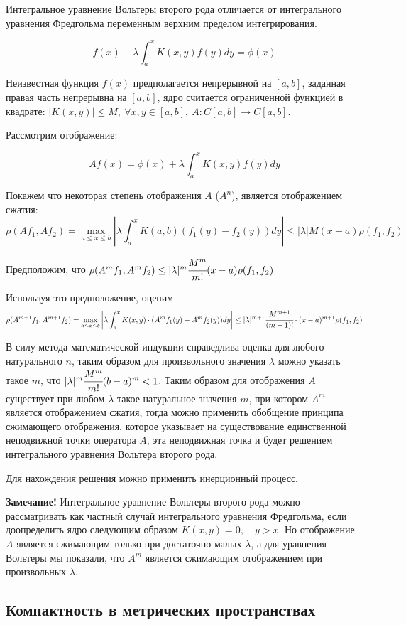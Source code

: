 \documentclass[14pt]{extarticle}
\theoremstyle{definition}
\theoremstyle{remark}
\renewcommand{\[}{\begin{dmath*}[compact]}
\renewcommand{\]}{\end{dmath*}}
\newcommand{\sep}{ , \ \allowbreak }
\begin{document}
Интегральное уравнение Вольтеры второго рода отличается от интегрального уравнения Фредгольма переменным верхним пределом интегрирования.

\[ f(x)-\lambda \int_a^xK(x,y)f(y)dy=\phi(x)\]

Неизвестная функция $f(x)$ предполагается непрерывной на $[a,b]$, заданная правая часть непрерывна на $[a,b]$, ядро считается ограниченной функцией в квадрате: $|K(x,y)|\leq M\sep\forall x,y\in[a,b]\sep A:C[a,b]\to C[a,b]$.

Рассмотрим отображение:

\[ Af(x)=\phi(x)+\lambda\int_a^xK(x,y)f(y)dy \]

Покажем что некоторая степень отображения $A$ ($A^n$), является отображением сжатия:
\[\rho(Af_1,Af_2)=\max_{a\leq x\leq b}\left|\lambda\int_a^xK(a,b)(f_1(y)-f_2(y))dy\right|
\leq |\lambda|M(x-a)\rho(f_1,f_2)
\]

Предположим, что $\rho(A^mf_1,A^mf_2)\leq |\lambda|^m\cfrac{M^m}{m!}(x-a)\rho(f_1,f_2)$

Используя это предположение, оценим
\[
{\rho(A^{m+1}f_1,A^{m+1}f_2)}
=\max_{a\leq x\leq b}\left|\lambda\int_a^xK(x,y)\cdot(A^mf_1(y)-A^mf_2(y))dy\right|
\leq|\lambda|^{m+1}\cfrac{M^{m+1}}{(m+1)!}\cdot(x-a)^{m+1}\rho(f_1,f_2)
\]

В силу метода математической индукции справедлива оценка для любого натурального $n$, таким образом для произвольного значения $\lambda$ можно указать такое $m$, что $|\lambda|^m\cfrac{M^m}{m!}(b-a)^m<1$. Таким образом для отображения $A$ существует при любом $\lambda$ такое натуральное значения $m$, при котором $A^m$ является отображением сжатия, тогда можно применить обобщение принципа сжимающего отображения, которое  указывает на существование единственной неподвижной точки оператора $A$, эта неподвижная точка и будет решением интегрального уравнения Вольтера второго рода.

Для нахождения решения можно применить инерционный процесс.

\textbf{Замечание!} Интегральное уравнение Вольтеры второго рода можно рассматривать как частный случай интегрального уравнения Фредгольма, если доопределить ядро следующим образом $K(x,y)=0,\quad y>x$. Но отображение $A$ является сжимающим только при достаточно малых $\lambda$, а для уравнения Вольтеры мы показали, что $A^m$ является сжимающим отображением при произвольных $\lambda$.

\subsection{Компактность в метрических пространствах}
\end{document}
